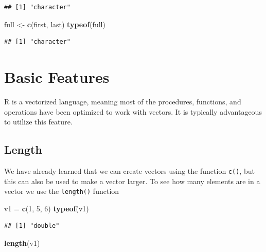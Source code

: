 \documentclass[
]{book}
\newenvironment{Shaded}{\begin{snugshade}}{\end{snugshade}}
\newcommand{\DecValTok}[1]{\textcolor[rgb]{0.00,0.00,0.81}{#1}}
\newcommand{\KeywordTok}[1]{\textcolor[rgb]{0.13,0.29,0.53}{\textbf{#1}}}
\newcommand{\NormalTok}[1]{#1}
\newcommand{\StringTok}[1]{\textcolor[rgb]{0.31,0.60,0.02}{#1}}
\begin{document}
\begin{verbatim}
## [1] "character"
\end{verbatim}

\begin{Shaded}
\begin{Highlighting}[]
\NormalTok{full <-}\StringTok{ }\KeywordTok{c}\NormalTok{(first, last)}
\KeywordTok{typeof}\NormalTok{(full)}
\end{Highlighting}
\end{Shaded}

\begin{verbatim}
## [1] "character"
\end{verbatim}

\hypertarget{basic-features}{%
\section{Basic Features}\label{basic-features}}

R is a vectorized language, meaning most of the procedures, functions, and operations have been optimized to work with vectors. It is typically advantageous to utilize this feature.

\hypertarget{length}{%
\subsection{Length}\label{length}}

We have already learned that we can create vectors using the function \texttt{c()}, but this can also be used to make a vector larger. To see how many elements are in a vector we use the \texttt{length()} function

\begin{Shaded}
\begin{Highlighting}[]
\NormalTok{v1 =}\StringTok{ }\KeywordTok{c}\NormalTok{(}\DecValTok{1}\NormalTok{, }\DecValTok{5}\NormalTok{, }\DecValTok{6}\NormalTok{)}
\KeywordTok{typeof}\NormalTok{(v1)}
\end{Highlighting}
\end{Shaded}

\begin{verbatim}
## [1] "double"
\end{verbatim}

\begin{Shaded}
\begin{Highlighting}[]
\KeywordTok{length}\NormalTok{(v1)}
\end{Highlighting}
\end{Shaded}
\end{document}
